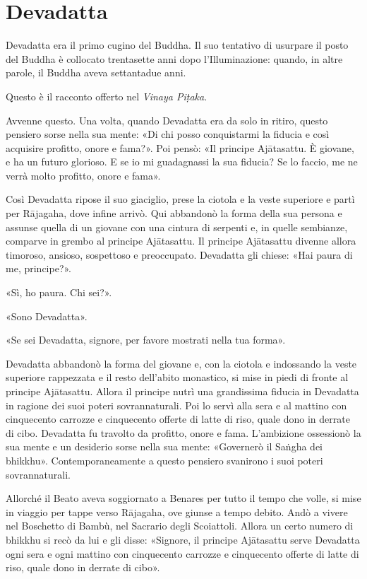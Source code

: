 \chapter{Devadatta}

 Devadatta era il primo cugino del Buddha. Il suo
tentativo di usurpare il posto del Buddha è collocato trentasette anni dopo
l’Illuminazione: quando, in altre parole, il Buddha aveva settantadue anni.

 Questo è il racconto offerto nel \emph{Vinaya
  Piṭaka}.

 Avvenne questo. Una volta, quando Devadatta era da solo in
ritiro, questo pensiero sorse nella sua mente: «Di chi posso conquistarmi la
fiducia e così acquisire profitto, onore e fama?». Poi pensò: «Il principe
Ajātasattu. È giovane, e ha un futuro glorioso. E se io mi guadagnassi la sua
fiducia? Se lo faccio, me ne verrà molto profitto, onore e fama».

Così Devadatta ripose il suo giaciglio, prese la ciotola e la veste superiore e
partì per Rājagaha, dove infine arrivò. Qui abbandonò la forma della sua persona
e assunse quella di un giovane con una cintura di serpenti e, in quelle
sembianze, comparve in grembo al principe Ajātasattu. Il principe Ajātasattu
divenne allora timoroso, ansioso, sospettoso e preoccupato. Devadatta gli
chiese: «Hai paura di me, principe?».

«Sì, ho paura. Chi sei?».

«Sono Devadatta».

«Se sei Devadatta, signore, per favore mostrati nella tua forma».

Devadatta abbandonò la forma del giovane e, con la ciotola e indossando la veste
superiore rappezzata e il resto dell’abito monastico, si mise in piedi di fronte
al principe Ajātasattu. Allora il principe nutrì una grandissima fiducia in
Devadatta in ragione dei suoi poteri sovrannaturali. Poi lo servì alla sera e al
mattino con cinquecento carrozze e cinquecento offerte di latte di riso, quale
dono in derrate di cibo. Devadatta fu travolto da profitto, onore e fama.
L’ambizione ossessionò la sua mente e un desiderio sorse nella sua mente:
«Governerò il Saṅgha dei bhikkhu». Contemporaneamente a questo pensiero
svanirono i suoi poteri sovrannaturali.


Allorché il Beato aveva soggiornato a Benares per tutto il tempo che volle, si
mise in viaggio per tappe verso Rājagaha, ove giunse a tempo debito. Andò a
vivere nel Boschetto di Bambù, nel Sacrario degli Scoiattoli. Allora un certo
numero di bhikkhu si recò da lui e gli disse: «Signore, il principe Ajātasattu
serve Devadatta ogni sera e ogni mattino con cinquecento carrozze e cinquecento
offerte di latte di riso, quale dono in derrate di cibo».

